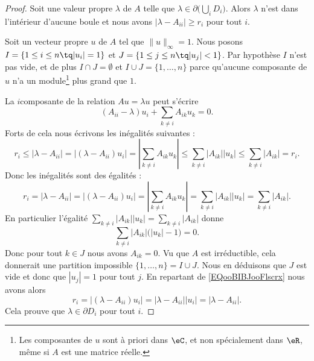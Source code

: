 \begin{proof}
	Soit une valeur propre \( \lambda\) de \( A\) telle que \( \lambda\in \partial\big( \bigcup_iD_i \big)\). Alors \( \lambda\) n'est dans l'intérieur d'aucune boule et nous avons \( | \lambda-A_{ii} |\geq r_i\) pour tout \( i\).

	Soit un vecteur propre \( u\) de \( A\) tel que \( \| u \|_{\infty}=1\). Nous posons \( I= \{ 1\leq i\leq n \tq | u_i |=1 \}  \) et \( J=\{ 1\leq j\leq n\tq | u_j |<1 \}\). Par hypothèse \( I\) n'est pas vide, et de plus \( I\cap J=\emptyset\) et \( I\cup J=\{ 1,\ldots, n \}\) parce qu'aucune composante de \( u\) n'a un module\footnote{Les composantes de \( u\) sont à priori dans \( \eC\), et non spécialement dans \( \eR\), même si \( A\) est une matrice réelle.} plus grand que \( 1\).

	La \( i\)\ieme composante de la relation \( Au=\lambda u\) peut s'écrire
	\begin{equation}
		(A_{ii}-\lambda)u_i+\sum_{k\neq i}A_{ik}u_k=0.
	\end{equation}
	Forts de cela nous écrivons les inégalités suivantes :
	\begin{equation}
		r_i\leq | \lambda-A_{ii} |=\big| (\lambda-A_{ii})u_i \big|=| \sum_{k\neq i}A_{ik}u_k |\leq \sum_{k\neq i}| A_{ik} | |u_k |\leq \sum_{k\neq i}| A_{ik} |=r_i.
	\end{equation}
	Donc les inégalités sont des égalités :
	\begin{equation}        \label{EQooBIBJooFlscrx}
		r_i= | \lambda-A_{ii} |=\big| (\lambda-A_{ii})u_i \big|=| \sum_{k\neq i}A_{ik}u_k |=\sum_{k\neq i}| A_{ik} | |u_k |=\sum_{k\neq i}| A_{ik} |.
	\end{equation}
	En particulier l'égalité \( \sum_{k\neq i}| A_{ik} | |u_k |=\sum_{k\neq i}| A_{ik} |\) donne
	\begin{equation}
		\sum_{k\neq i}| A_{ik} |\big( | u_k |-1 \big)=0.
	\end{equation}
	Donc pour tout \( k\in J\) nous avons \( A_{ik}=0\). Vu que \( A\) est irréductible, cela donnerait une partition impossible \( \{ 1,\ldots, n \}=I\cup J\). Nous en déduisons que \( J\) est vide et donc que \( | u_j |=1\) pour tout \( j\). En repartant de \eqref{EQooBIBJooFlscrx} nous avons alors
	\begin{equation}
		r_i=\big| (\lambda-A_{ii})u_i \big|=| \lambda-A_{ii} | |u_i |=| \lambda-A_{ii} |.
	\end{equation}
	Cela prouve que \( \lambda\in\partial D_i\) pour tout \( i\).
\end{proof}

